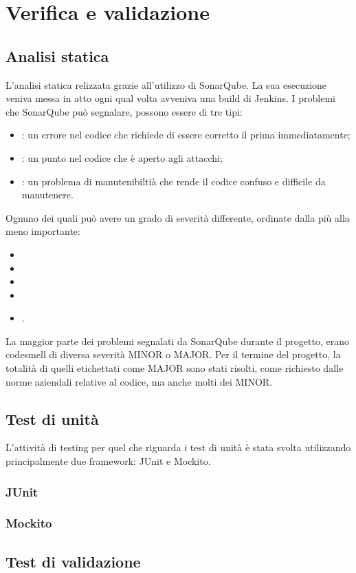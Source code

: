 
\chapter{Verifica e validazione}
\label{cap:testing} %

\section{Analisi statica}
L'analisi statica relizzata grazie all'utilizzo di SonarQube.
La sua esecuzione veniva messa in atto ogni qual volta avveniva una build di Jenkins.
I problemi che SonarQube può segnalare, possono essere di tre tipi:
\begin{itemize}
    \item {}: un errore nel codice che richiede di essere corretto il prima immediatamente;
    \item {}: un punto nel codice che è aperto agli attacchi;
    \item {}:  un problema di manutenibiltià che rende il codice confuso e difficile da manutenere.
\end{itemize}
Ognuno dei quali può avere un grado di severità differente, ordinate dalla più alla meno importante:
\begin{itemize}
    \item {}
    \item {}
    \item {}
    \item {}
    \item {}.
\end{itemize}

La maggior parte dei problemi segnalati da SonarQube durante il progetto, erano codesmell di diversa severità MINOR o MAJOR.
Per il termine del progetto, la totalità di quelli etichettati come MAJOR sono stati risolti, come richiesto dalle norme aziendali relative al codice, ma anche molti dei MINOR.
 


\section{Test di unità}

L'attività di testing per quel che riguarda i test di unità è stata svolta utilizzando principalmente due framework: JUnit e Mockito.

    \subsection{JUnit}


    \subsection{Mockito}



\section{Test di validazione}


